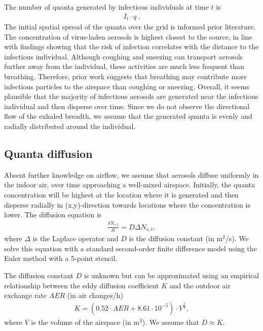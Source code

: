 \documentclass[fleqn,11pt]{wlscirep_supp}
\begin{document}
The number of quanta generated by infectious individuals at time $t$ is 
\begin{align}\label{eq:generation}
    I_t \cdot q ~.
\end{align}
The initial spatial spread of the quanta over the grid is informed prior literature. The concentration of virus-laden aerosols is highest closest to the source\cite{Vuorinen2020SafSci,Chen2020BuildEnv}, in line with findings showing that the risk of infection correlates with the distance to the infectious individual\cite{Ko2004RiskAnal,Kenyon1996NEJM}. Although coughing and sneezing can transport aerosols further away from the individual, these activities are much less frequent than breathing. Therefore, prior work suggests that breathing may contribute more infectious particles to the airspace than coughing or sneezing\cite{Dinkele2022AJRCCM}. Overall, it seems plausible that the majority of infectious aerosols are generated near the infectious individual and then disperse over time. Since we do not observe the directional flow of the exhaled breadth, we assume that the generated quanta is evenly and radially distributed around the individual. 

\subsection{Quanta diffusion}\label{sec:quanta-diffusion}

Absent further knowledge on airflow, we assume that aerosols diffuse uniformly in the indoor air, over time approaching a well-mixed airspace. Initially, the quanta concentration will be highest at the location where it is generated and then disperse radially in (x,y)-direction towards locations where the concentration is lower. The diffusion equation is 
\begin{align}\label{eq:diffusion}
    \frac{\delta N_{s,t}}{\delta t} = D \Delta N_{s,t},
\end{align}
where $\Delta$ is the Laplace operator and $D$ is the diffusion constant (in m$^2$/s). We solve this equation with a standard second-order finite difference model using the Euler method with a 5-point stencil. 

The diffusion constant $D$ is unknown but can be approximated using an empirical relationship between the eddy diffusion coefficient $K$ and the outdoor air exchange rate $AER$ (in air changes/h)\cite{Cheng2011EnvSciTech}
\begin{align}
    K = (0.52 \cdot AER + 8.61\cdot10^{-5}) \cdot V^{\frac{2}{3}},
\end{align}
where $V$ is the volume of the airspace (in m$^3$). We assume that $D \approx K$. 
\end{document}
